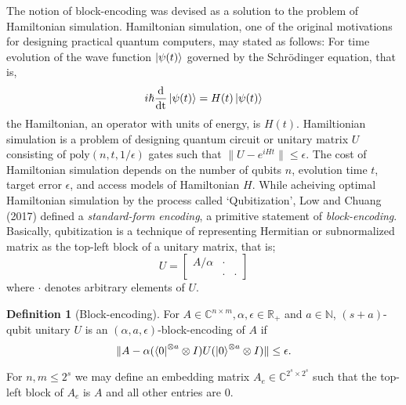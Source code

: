 \documentclass[10pt,twoside,reqno]{amsart} %
\theoremstyle{plain}
\theoremstyle{definition}
\newtheorem{defn}[thm]{Definition}
\begin{document}
The notion of block-encoding was devised as a solution to the problem of
Hamiltonian simulation. Hamiltonian simulation, one of the original motivations
for designing practical quantum computers, may stated as follows: For time
evolution of the wave function $\ket{\psi(t)}$ governed by the Schr{\"o}dinger
equation, that is,
\[
  i\hslash\frac{\textrm{d}}{\textrm{dt}}\ket{\psi(t)}
  = H(t)\ket{\psi(t)}
\]
the Hamiltonian, an operator with units of energy, is $H(t)$. Hamiltionian
simulation is a problem of designing quantum circuit or unitary matrix $U$
consisting of $\textrm{poly}(n,t,1/\epsilon)$ gates such that $\|U-{e^{iHt}}\|\leq
\epsilon$. %
The cost of Hamiltonian simulation depends on the number of qubits
$n$, evolution time $t$, target error $\epsilon$, and access models of
Hamiltonian $H$. While acheiving optimal Hamiltonian simulation by the
process called `Qubitization', Low and Chuang (2017) defined a \emph{standard-form
encoding}, a primitive statement of \emph{block-encoding}. Basically, 
qubitization is a technique of representing Hermitian or subnormalized matrix
as the top-left block of a unitary matrix, that is;
\[
  U=\begin{bmatrix}A/\alpha &\cdot \\ &\cdot &\cdot \end{bmatrix}
\]
where $\cdot$ denotes arbitrary elements of $U$. 
\begin{defn}[Block-encoding] For $A\in\mathbb{C}^{n\times m}, \alpha,\epsilon
  \in\mathbb{R}_{+}$ and $a\in\mathbb{N}$, $(s+a)$-qubit unitary $U$ is an
  $(\alpha,a,\epsilon)$-block-encoding of $A$ if
  \[
    \|A-\alpha(\bra0^{\otimes a}\otimes I)U(\ket0^{\otimes a}\otimes I)\|\leq
    \epsilon.
  \]
\end{defn}
For $n,m\leq 2^s$ we may define an embedding matrix $A_e\in
\mathbb{C}^{2^s\times 2^s}$ such that the top-left block of $A_e$ is $A$ and
all other entries are $0$.
\end{document}
